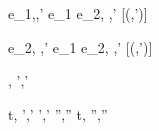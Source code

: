   {e_1,\hat\sigma \hat\normalise {},\hat{\sigma}'}
  {e_1 \Xor e_2,\hat\sigma \xrightarrow[]{\Left} ,\hat{\sigma}'}
  [\neg\Failing(,\hat{\sigma}')]

  {e_2,\hat\sigma \hat{\normalise} ,\hat{\sigma}'}
  {e_1 \Xor e_2,\hat\sigma \xrightarrow[]{\Right} ,\hat{\sigma}'}
  [\neg\Failing(,\hat{\sigma}')]




  {,\hat{\sigma}  ',\hat{\sigma}'}



  {t,\sigma {} ',\hat{\sigma}' \Quad
   ',\hat{\sigma}' \hat{\normalise} '',\hat{\sigma}''}
  {t,\sigma {} '',\hat{\sigma}''}
